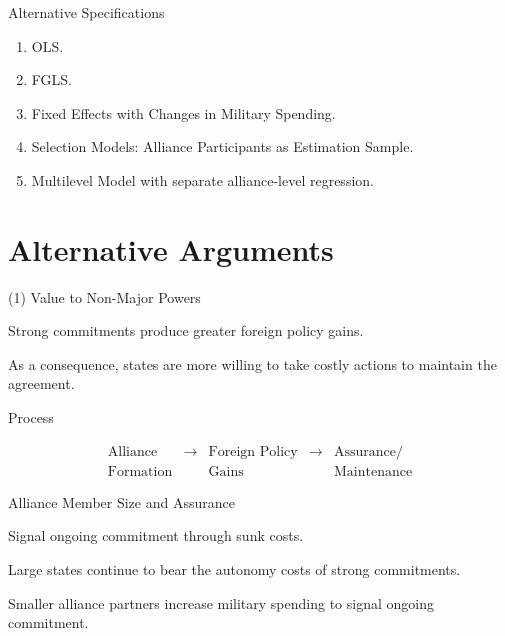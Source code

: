 \documentclass{beamer}
\begin{document}

\begin{frame}{Alternative Specifications} 

\begin{enumerate}
\item OLS.
\item FGLS.
\item Fixed Effects with Changes in Military Spending.  
\item Selection Models: Alliance Participants as Estimation Sample.
\item Multilevel Model with separate alliance-level regression. 
\end{enumerate}

\end{frame}


\section{Alternative Arguments}


\begin{frame}{(1) Value to Non-Major Powers} 

Strong commitments produce greater foreign policy gains. 

\pause

As a consequence, states are more willing to take costly actions to maintain the agreement. 


\end{frame}


\begin{frame}{Process}

\[
\begin{array}{ccccc}
\mbox{Alliance} &  \longrightarrow & \mbox{Foreign Policy} & \longrightarrow & \mbox{Assurance/} \\
\mbox{Formation} &                 & \mbox{Gains}     &                      & \mbox{Maintenance} 
\end{array}
\]


\end{frame} 


\begin{frame}{Alliance Member Size and Assurance}

Signal ongoing commitment through sunk costs.

\pause

Large states continue to bear the autonomy costs of strong commitments. %

\pause 

Smaller alliance partners increase military spending to signal ongoing commitment. 

\end{frame}
\end{document}
